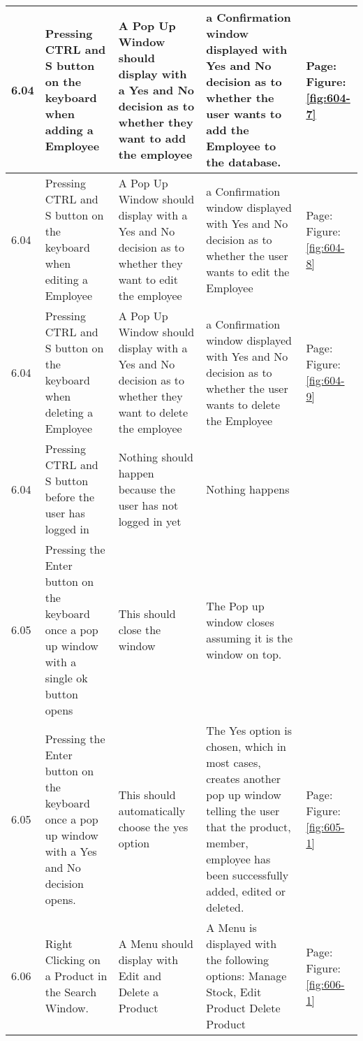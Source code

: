 \begin{flushleft}
\begin{longtable}{|p{1.0cm}|p{2.5cm}|p{3cm}|p{3.0cm}|p{2.5cm}|}
	6.04 & Pressing CTRL and S button on the keyboard when adding a Employee &A Pop Up Window should display with a Yes and No decision as to whether they want to add the employee & a Confirmation window displayed with Yes and No decision as to whether the user wants to add the Employee to the database.&   Page:\pageref{fig:604-7}  \newline Figure:\ref{fig:604-7}\\ \hline
	6.04 & Pressing CTRL and S button on the keyboard when editing a Employee &A Pop Up Window should display with a Yes and No decision as to whether they want to edit the employee & a Confirmation window displayed with Yes and No decision as to whether the user wants to edit the Employee&         Page:\pageref{fig:604-8}  \newline Figure:\ref{fig:604-8}\\ \hline
	6.04 & Pressing CTRL and S button on the keyboard when deleting a Employee &A Pop Up Window should display with a Yes and No decision as to whether they want to delete the employee & a Confirmation window displayed with Yes and No decision as to whether the user wants to delete the Employee&     Page:\pageref{fig:604-9}  \newline Figure:\ref{fig:604-9}\\ \hline
	6.04 & Pressing CTRL and S button before the user has logged in & Nothing should happen because the user has not logged in yet & Nothing happens& \\ \hline
	6.05 &  Pressing the Enter button on the keyboard once a pop up window with a single ok button opens & This should close the window & The Pop up window closes assuming it is the window on top.& \\ \hline
	6.05 &  Pressing the Enter button on the keyboard once a pop up window with a Yes and No decision opens. & This should automatically choose the yes option & The Yes option is chosen, which in most cases, creates another pop up window telling the user that the product, member, employee has been successfully added, edited or deleted.& Page:\pageref{fig:605-1}  \newline Figure:\ref{fig:605-1} \\ \hline
	6.06 & Right Clicking on a Product in the Search Window. & A Menu should display with Edit and Delete a Product & A Menu is displayed with the following options: Manage Stock, Edit Product Delete Product & Page:\pageref{fig:606-1}  \newline Figure:\ref{fig:606-1}\\ \hline

\end{longtable}
\end{flushleft}
